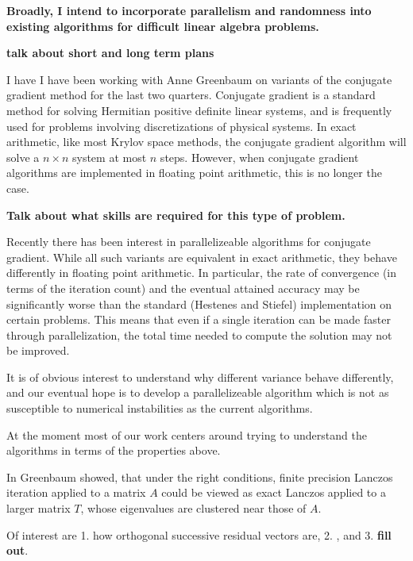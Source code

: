 \documentclass[11pt]{article}
\begin{document}
\maketitle
\vspace{2em}

\textbf{Broadly, I intend to incorporate parallelism and randomness into existing algorithms for difficult linear algebra problems.}

\textbf{talk about short and long term plans}


I have I have been working with Anne Greenbaum on variants of the conjugate gradient method for the last two quarters. Conjugate gradient is a standard method for solving Hermitian positive definite linear systems, and is frequently used for problems involving discretizations of physical systems. In exact arithmetic, like most Krylov space methods, the conjugate gradient algorithm will solve a \( n\times n \) system at most \( n \) steps. However, when conjugate gradient algorithms are implemented in floating point arithmetic, this is no longer the case.

\textbf{Talk about what skills are required for this type of problem.}


Recently there has been interest in parallelizeable algorithms for conjugate gradient.
While all such variants are equivalent in exact arithmetic, they behave differently in floating point arithmetic. In particular, the rate of convergence (in terms of the iteration count) and the eventual attained accuracy may be significantly worse than the standard (Hestenes and Stiefel) implementation on certain problems. This means that even if a single iteration can be made faster through parallelization, the total time needed to compute the solution may not be improved. 

It is of obvious interest to understand why different variance behave differently, and our eventual hope is to develop a parallelizeable algorithm which is not as susceptible to numerical instabilities as the current algorithms. 

At the moment most of our work centers around trying to understand the algorithms in terms of the properties above. 

In \cite{perturbed_lanczos} Greenbaum showed, that under the right conditions, finite precision Lanczos iteration applied to a matrix \( A \) could be viewed as exact Lanczos applied to a larger matrix \( T \), whose eigenvalues are clustered near those of \( A \).

Of interest are 1. how orthogonal successive residual vectors are, 2. , and 3. \textbf{fill out}.
\end{document}
